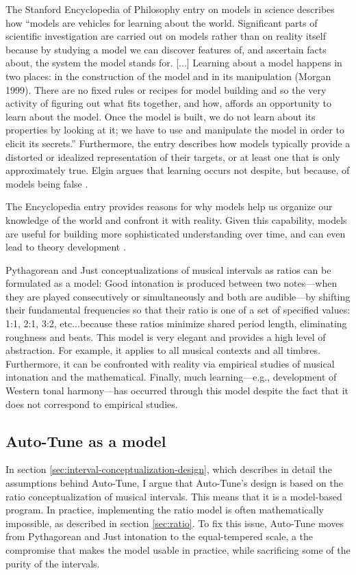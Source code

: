 The Stanford Encyclopedia of Philosophy entry on models in science describes how ``models are vehicles for learning about the world. Significant parts of scientific investigation are carried out on models rather than on reality itself because by studying a model we can discover features of, and ascertain facts about, the system the model stands for. [...] Learning about a model happens in two places: in the construction of the model and in its manipulation (Morgan 1999). There are no fixed rules or recipes for model building and so the very activity of figuring out what fits together, and how, affords an opportunity to learn about the model. Once the model is built, we do not learn about its properties by looking at it; we have to use and manipulate the model in order to elicit its secrets.'' \cite{sep-models-science} Furthermore, the entry describes how models typically provide a distorted or idealized representation of their targets, or at least one that is only approximately true. Elgin argues that learning occurs not despite, but because, of models being false \cite{elgin2017true}. 

The Encyclopedia entry provides reasons for why models help us organize our knowledge of the world and confront it with reality. Given this capability, models are useful for building more sophisticated understanding over time, and can even lead to theory development \cite{sep-models-science}.

Pythagorean and Just conceptualizations of musical intervals as ratios can be formulated as a model: Good intonation is produced between two notes---when they are played consecutively or simultaneously and both are audible---by shifting their fundamental frequencies so that their ratio is one of a set of specified values: 1:1, 2:1, 3:2, etc...because these ratios minimize shared period length, eliminating roughness and beats. This model is very elegant and provides a high level of abstraction. For example, it applies to all musical contexts and all timbres. Furthermore, it can be confronted with reality via  empirical studies of musical intonation and the mathematical. Finally, much learning---e.g., development of Western tonal harmony---has occurred through this model despite the fact that it does not correspond to empirical studies. 

\subsection{Auto-Tune as a model}
In section \ref{sec:interval-conceptualization-design}, which describes in detail the assumptions behind Auto-Tune, I argue that Auto-Tune's design is based on the ratio conceptualization of musical intervals. This means that it is a model-based program. In practice, implementing the ratio model is often mathematically impossible, as described in section \ref{sec:ratio}. To fix this issue, Auto-Tune moves from Pythagorean and Just intonation to the equal-tempered scale, a the compromise that makes the model usable in practice, while sacrificing some of the purity of the intervals.

